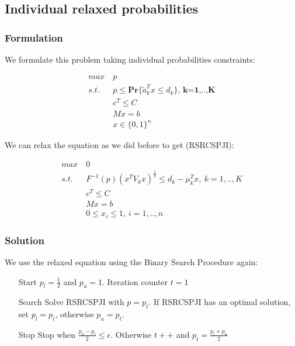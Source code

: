 \documentclass{beamer}
\begin{document}
\subsection{Individual relaxed probabilities}
\subsubsection{Formulation}
\begin{frame}
	We formulate this problem taking individual probabilities constraints:
	
\begin{align*}
 max\ & p\\
 s.t.\ & p \leq \mathbf{Pr} \{ \tilde{a}_k^Tx \leq d_k \}\textbf{,\ k=1,..,K} \\
 & c^T \leq C \\
 & Mx = b \\
 & x \in \{0, 1\}^n
\end{align*}
\end{frame}

\begin{frame}

We can relax the equation as we did before to get (RSRCSPJI):

\begin{align*}
 max\ & 0\\
 s.t.\ & F^{-1}(p)(x^TV_kx)^{\frac{1}{2}} \leq d_k - \mu_k^Tx,\ k=1,..,K \\
 & c^T \leq C \\
 & Mx = b \\
 & 0 \leq x_i \leq 1,\ i=1,..,n
\end{align*}
\end{frame}

\subsubsection{Solution}

\begin{frame}

We use the relaxed equation using the Binary Search Procedure again:

\begin{itemize}
\item[Start] $p_l = \frac{1}{2}$ and $p_u = 1$. Iteration counter $t = 1$
\item[Search] Solve RSRCSPJI with $p = p_t$. If RSRCSPJI has an optimal solution, set $p_l = p_t$, otherwise $p_u = p_t$.
\item[Stop] Stop when $\frac{p_u - p_l}{2} \leq \epsilon$. Otherwise $t++$ and $p_t = \frac{p_l + p_u}{2} $
\end{itemize}
\end{frame}
\end{document}

